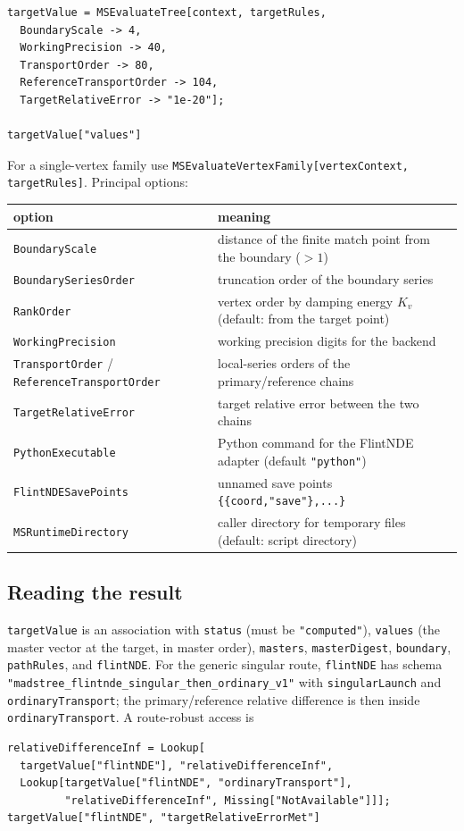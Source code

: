 \documentclass[11pt,a4paper]{article}
\begin{document}
\begin{verbatim}
targetValue = MSEvaluateTree[context, targetRules,
  BoundaryScale -> 4,
  WorkingPrecision -> 40,
  TransportOrder -> 80,
  ReferenceTransportOrder -> 104,
  TargetRelativeError -> "1e-20"];

targetValue["values"]
\end{verbatim}
For a single-vertex family use \texttt{MSEvaluateVertexFamily[vertexContext, targetRules]}.
Principal options:
\begin{center}
\begin{tabular}{@{}p{5.2cm}p{9.6cm}@{}}
\toprule
option & meaning\\
\midrule
\texttt{BoundaryScale} & distance of the finite match point from the boundary ($>1$)\\
\texttt{BoundarySeriesOrder} & truncation order of the boundary series\\
\texttt{RankOrder} & vertex order by damping energy $K_v$ (default: from the target point)\\
\texttt{WorkingPrecision} & working precision digits for the backend\\
\texttt{TransportOrder} / \texttt{ReferenceTransportOrder} & local-series orders of the
primary/reference chains\\
\texttt{TargetRelativeError} & target relative error between the two chains\\
\texttt{PythonExecutable} & Python command for the FlintNDE adapter (default \texttt{"python"})\\
\texttt{FlintNDESavePoints} & unnamed save points \texttt{\{\{coord,"save"\},...\}}\\
\texttt{MSRuntimeDirectory} & caller directory for temporary files (default: script directory)\\
\bottomrule
\end{tabular}
\end{center}

\subsection{Reading the result}

\texttt{targetValue} is an association with \texttt{status} (must be \texttt{"computed"}),
\texttt{values} (the master vector at the target, in master order), \texttt{masters},
\texttt{masterDigest}, \texttt{boundary}, \texttt{pathRules}, and \texttt{flintNDE}. For the
generic singular route, \texttt{flintNDE} has schema
\texttt{"madstree\_flintnde\_singular\_then\_ordinary\_v1"} with \texttt{singularLaunch} and
\texttt{ordinaryTransport}; the primary/reference relative difference is then inside
\texttt{ordinaryTransport}. A route-robust access is
\begin{verbatim}
relativeDifferenceInf = Lookup[
  targetValue["flintNDE"], "relativeDifferenceInf",
  Lookup[targetValue["flintNDE", "ordinaryTransport"],
         "relativeDifferenceInf", Missing["NotAvailable"]]];
targetValue["flintNDE", "targetRelativeErrorMet"]
\end{verbatim}
\end{document}
